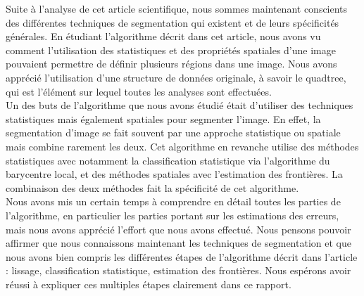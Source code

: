 Suite à l'analyse de cet article scientifique, nous sommes maintenant conscients des différentes techniques de segmentation qui existent et de leurs spécificités générales. En étudiant l'algorithme décrit dans cet article, nous avons vu comment l'utilisation des statistiques et des propriétés spatiales d'une image pouvaient permettre de définir plusieurs régions dans une image. Nous avons apprécié l'utilisation d'une structure de données originale, à savoir le quadtree, qui est l'élément sur lequel toutes les analyses sont effectuées.\\

Un des buts de l'algorithme que nous avons étudié était d'utiliser des techniques statistiques mais également spatiales pour segmenter l'image. En effet, la segmentation d'image se fait souvent par une approche statistique ou spatiale mais combine rarement les deux. Cet algorithme en revanche utilise des méthodes statistiques avec notamment la classification statistique via l'algorithme du barycentre local, et des méthodes spatiales avec l'estimation des frontières. La combinaison des deux méthodes fait la spécificité de cet algorithme.\\

Nous avons mis un certain temps à comprendre en détail toutes les parties de l'algorithme, en particulier les parties portant sur les estimations des erreurs, mais nous avons apprécié l'effort que nous avons effectué. Nous pensons pouvoir affirmer que nous connaissons maintenant les techniques de segmentation et que nous avons bien compris les différentes étapes de l'algorithme décrit dans l'article : lissage, classification statistique, estimation des frontières. Nous espérons avoir réussi à expliquer ces multiples étapes clairement dans ce rapport.